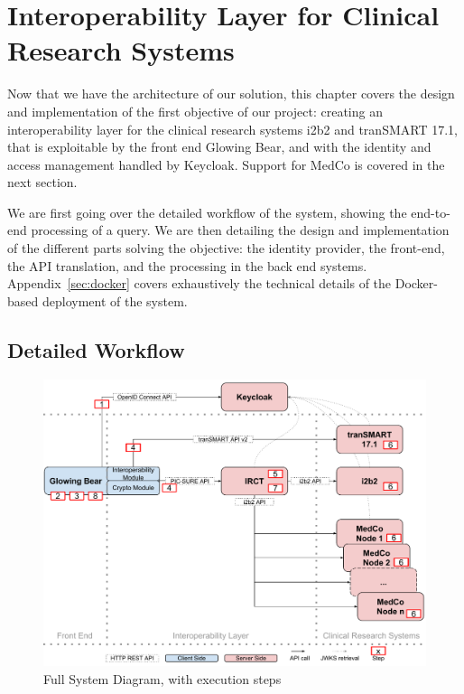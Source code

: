 \chapter{Interoperability Layer for Clinical Research Systems}
\label{sec:interoplayer}

Now that we have the architecture of our solution, this chapter covers the design and implementation of the first objective of our project: creating an interoperability layer for the clinical research systems i2b2 and tranSMART 17.1, that is exploitable by the front end Glowing Bear, and with the identity and access management handled by Keycloak.
Support for MedCo is covered in the next section.

We are first going over the detailed workflow of the system, showing the end-to-end processing of a query.
We are then detailing the design and implementation of the different parts solving the objective: the identity provider, the front-end, the API translation, and the processing in the back end systems.
Appendix~\ref{sec:docker} covers exhaustively the technical details of the Docker-based deployment of the system.


\section{Detailed Workflow}
\label{sec:interoplayer-wf}

\begin{figure}[ht]
    \centering
    \includegraphics[width=1\textwidth]{figures/sys_diagram_full_with_steps.pdf}
    \caption{Full System Diagram, with execution steps}
    \label{fig:sys-diagram-full-steps}
\end{figure}

